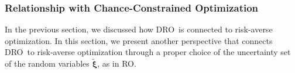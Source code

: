 \documentclass[final,onefignum,onetabnum]{class}
\newcommand{\bs}[1]{\boldsymbol{#1}} %
\newcommand{\Bs}[1]{\mathbb{#1}} %
\newcommand{\Ts}[1]{\mathbbmtt{#1}} %
\newcommand{\Cs}[1]{\mathcal{#1}} %
\newcommand{\txi}{\tilde{\bs{\xi}}}
\newcommand{\tbs}[1]{\tilde{\bs{#1}}}
\newcommand{\Pspace}[1]{\left( \Xi, \Cs{F}, #1 \right)}
\newcommand{\dro}{DRO}
\newcommand{\st}{\text{s.t.}}
\begin{document}
\begin{comment}
\begin{theorem}{\citet[Theorem~3.1]{bertsimas2009uncertainty}}
    \label{thm: duality_ro}
   Consider a probability space  \linebreak $\Pspace{Q}$, where $\Xi$ is a finite space with $M$ atoms  as $\Xi=\{\omega_{1}, \ldots, \omega_{M}\}$. Suppose that  $\tbs{a} \in \Bs{R}^{n}$ has $M$ outcomes $\{\tbs{a}(\omega_{1}), \ldots, \tbs{a}(\omega_{M})\}$, and let $\bs{A}=[\bs{a}_{1}, \ldots, \bs{a}_{M}]$, with $\bs{a}_{m}=\tbs{a}(\omega_{m})$. Let $\rho$ be a coherent risk measure.
	Then, 
	\begin{equation}
	    \label{eq: duality_ro}
	    \sset*{\bs{x} \in \Cs{X}}{\rho(\tbs{a}^{\top}\bs{x}-b) \le 0}=\sset*{\bs{x} \in \Cs{X}}{\bs{a}^{\top}\bs{x} \le b, \ \forall \bs{a} \in \Cs{U}}, 
	\end{equation}
	where   $\Cs{U}=\text{conv}(\{\bs{A}\bs{p}: \bs{p} \in \Cs{P}\})$ and $\Cs{M}$  is some set for which the representation  \eqref{eq: duality_rho} holds. Conversely, if $\Cs{U} \subseteq \text{conv}(\{\bs{a}_{1}, \ldots, \bs{a}_{M}\})$, then \eqref{eq: duality_ro} holds with the coherent risk measure generated by 
	$$\Cs{M}=\sset*{\bs{p} \in \Delta^{M}}{\exists \bs{a} \in \Cs{U} \ \st \ \bs{A} \bs{p}=\bs{a}}.$$
\end{theorem}

\end{comment}

\subsubsection{Relationship with Chance-Constrained Optimization}
\label{sec: rev.rel_chance}

In the previous section, we discussed how \dro\ is connected to risk-averse optimization. %
In this section, we present another perspective that connects \dro\ to risk-averse optimization through a proper choice of the uncertainty set of the random variables $\txi$, as in RO. 
\end{document}
